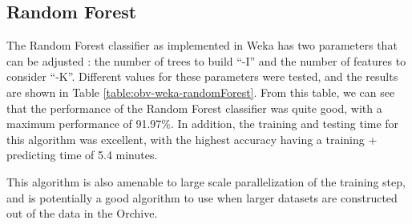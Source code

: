 %
%
\subsection{Random Forest}

The Random Forest classifier as implemented in Weka has two parameters
that can be adjusted : the number of trees to build ``-I'' and the
number of features to consider ``-K''.  Different values for these
parameters were tested, and the results are shown in Table
\ref{table:obv-weka-randomForest}.  From this table, we can see that
the performance of the Random Forest classifier was quite good, with a
maximum performance of 91.97\%.  In addition, the training and testing
time for this algorithm was excellent, with the highest accuracy
having a training + predicting time of 5.4 minutes.

This algorithm is also amenable to large scale parallelization of the
training step, and is potentially a good algorithm to use when larger
datasets are constructed out of the data in the Orchive.

